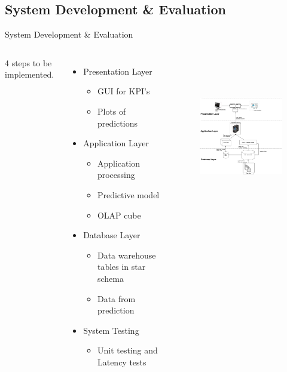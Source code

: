 \documentclass{beamer}
\begin{document}
\subsection{System Development \& Evaluation}
\begin{frame}{System Development \& Evaluation}
	\begin{columns}
			4 steps to be implemented.
	\begin{itemize}
		\item Presentation Layer
		\begin{itemize}
			\item GUI for KPI's
			\item Plots of predictions
		\end{itemize}
		\item Application Layer
		\begin{itemize}
			\item Application processing
			\item Predictive model
			\item OLAP cube
		\end{itemize}
		\item Database Layer
		\begin{itemize}
			\item Data warehouse tables in star schema
			\item Data from prediction
		\end{itemize}
		\item System Testing 
		\begin{itemize}
			\item Unit testing and Latency tests
		\end{itemize}
	\end{itemize}
	\begin{figure}
		\includegraphics[width=7cm,height=7cm]{figures/ICPCR_pic1SystemDesign}
		\centering
	\end{figure}
		\end{columns}
\end{frame}
\end{document}
